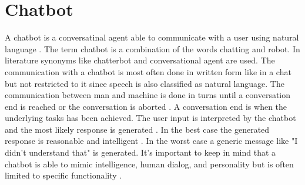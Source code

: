 \section{Chatbot}
A chatbot is a conversatinal agent able to communicate with a user using natural language 
\cite{evaluateChatbotsShawar2007, shawar2007chatbots, huang2007extracting, gregori2017evaluation}.
The term chatbot is a combination of the words chatting and robot.
In literature synonyms like chatterbot and conversational agent are used.
The communication with a chatbot is most often done in written form like in a chat but not restricted to it since 
speech is also classified as natural language.
The communication between man and machine is done in turns until a conversation end is reached 
or the conversation is aborted \cite{vrajitoru2004evolutionary}.
A conversation end is when the underlying tasks has been achieved.
The user input is interpreted by the chatbot and the most likely response is generated \cite{dutta2017developing}.
In the best case the generated response is reasonable and intelligent \cite{vrajitoru2004evolutionary}. 
In the worst case a generic message like "I didn't understand that" is generated.
It's important to keep in mind that a chatbot is able to mimic intelligence, human dialog, 
and personality but is often limited to specific functionality \cite{kane2016role, dutta2017developing}.

